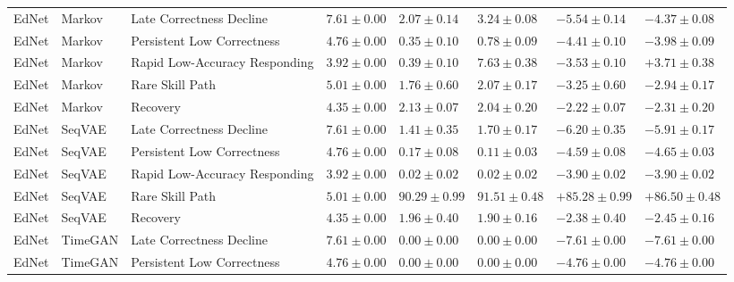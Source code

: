 \begin{longtable}{@{}p{2.0cm}p{1.8cm}p{3.1cm}p{2.0cm}p{2.25cm}p{2.25cm}p{2.35cm}p{2.35cm}@{}}
EdNet & Markov & Late Correctness Decline & $7.61 \mathbin{\pm} 0.00$ & $2.07 \mathbin{\pm} 0.14$ & $3.24 \mathbin{\pm} 0.08$ & $-5.54 \mathbin{\pm} 0.14$ & $-4.37 \mathbin{\pm} 0.08$ \\
EdNet & Markov & Persistent Low Correctness & $4.76 \mathbin{\pm} 0.00$ & $0.35 \mathbin{\pm} 0.10$ & $0.78 \mathbin{\pm} 0.09$ & $-4.41 \mathbin{\pm} 0.10$ & $-3.98 \mathbin{\pm} 0.09$ \\
EdNet & Markov & Rapid Low-Accuracy Responding & $3.92 \mathbin{\pm} 0.00$ & $0.39 \mathbin{\pm} 0.10$ & $7.63 \mathbin{\pm} 0.38$ & $-3.53 \mathbin{\pm} 0.10$ & $+3.71 \mathbin{\pm} 0.38$ \\
EdNet & Markov & Rare Skill Path & $5.01 \mathbin{\pm} 0.00$ & $1.76 \mathbin{\pm} 0.60$ & $2.07 \mathbin{\pm} 0.17$ & $-3.25 \mathbin{\pm} 0.60$ & $-2.94 \mathbin{\pm} 0.17$ \\
EdNet & Markov & Recovery & $4.35 \mathbin{\pm} 0.00$ & $2.13 \mathbin{\pm} 0.07$ & $2.04 \mathbin{\pm} 0.20$ & $-2.22 \mathbin{\pm} 0.07$ & $-2.31 \mathbin{\pm} 0.20$ \\
EdNet & SeqVAE & Late Correctness Decline & $7.61 \mathbin{\pm} 0.00$ & $1.41 \mathbin{\pm} 0.35$ & $1.70 \mathbin{\pm} 0.17$ & $-6.20 \mathbin{\pm} 0.35$ & $-5.91 \mathbin{\pm} 0.17$ \\
EdNet & SeqVAE & Persistent Low Correctness & $4.76 \mathbin{\pm} 0.00$ & $0.17 \mathbin{\pm} 0.08$ & $0.11 \mathbin{\pm} 0.03$ & $-4.59 \mathbin{\pm} 0.08$ & $-4.65 \mathbin{\pm} 0.03$ \\
EdNet & SeqVAE & Rapid Low-Accuracy Responding & $3.92 \mathbin{\pm} 0.00$ & $0.02 \mathbin{\pm} 0.02$ & $0.02 \mathbin{\pm} 0.02$ & $-3.90 \mathbin{\pm} 0.02$ & $-3.90 \mathbin{\pm} 0.02$ \\
EdNet & SeqVAE & Rare Skill Path & $5.01 \mathbin{\pm} 0.00$ & $90.29 \mathbin{\pm} 0.99$ & $91.51 \mathbin{\pm} 0.48$ & $+85.28 \mathbin{\pm} 0.99$ & $+86.50 \mathbin{\pm} 0.48$ \\
EdNet & SeqVAE & Recovery & $4.35 \mathbin{\pm} 0.00$ & $1.96 \mathbin{\pm} 0.40$ & $1.90 \mathbin{\pm} 0.16$ & $-2.38 \mathbin{\pm} 0.40$ & $-2.45 \mathbin{\pm} 0.16$ \\
EdNet & TimeGAN & Late Correctness Decline & $7.61 \mathbin{\pm} 0.00$ & $0.00 \mathbin{\pm} 0.00$ & $0.00 \mathbin{\pm} 0.00$ & $-7.61 \mathbin{\pm} 0.00$ & $-7.61 \mathbin{\pm} 0.00$ \\
EdNet & TimeGAN & Persistent Low Correctness & $4.76 \mathbin{\pm} 0.00$ & $0.00 \mathbin{\pm} 0.00$ & $0.00 \mathbin{\pm} 0.00$ & $-4.76 \mathbin{\pm} 0.00$ & $-4.76 \mathbin{\pm} 0.00$ \\

\end{longtable}
